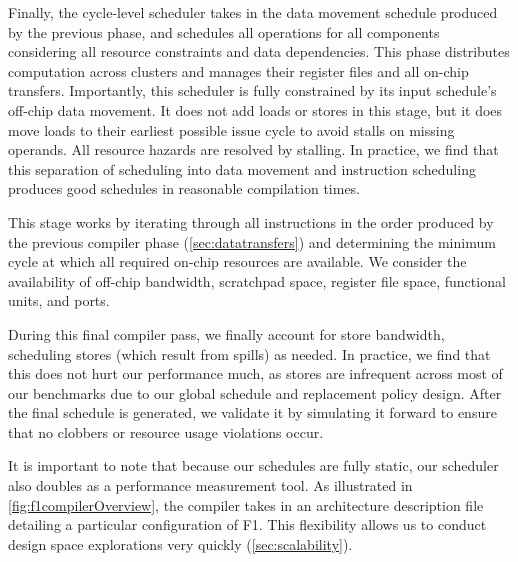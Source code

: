 Finally, the cycle-level scheduler takes in the data movement schedule produced
by the previous phase, and schedules all operations for all components
considering all resource constraints and data dependencies. This phase
distributes computation across clusters and manages their register files and
all on-chip transfers. Importantly, this scheduler is fully constrained by its
input schedule's off-chip data movement. It does not add loads or stores in
this stage, but it does move loads to their earliest possible issue cycle to
avoid stalls on missing operands. All resource hazards are resolved by
stalling. In practice, we find that this separation of scheduling into data
movement and instruction scheduling produces good schedules in reasonable
compilation times.

This stage works by iterating through all instructions in the order produced by
the previous compiler phase (\autoref{sec:datatransfers}) and determining the
minimum cycle at which all required on-chip resources are available. We
consider the availability of off-chip bandwidth, scratchpad space, register
file space, functional units, and ports.

During this final compiler pass, we finally account for store bandwidth,
scheduling stores (which result from spills) as needed. In practice, we find
that this does not hurt our performance much, as stores are infrequent across
most of our benchmarks due to our global schedule and replacement policy
design. After the final schedule is generated, we validate it by simulating it
forward to ensure that no clobbers or resource usage violations occur.

It is important to note that because our schedules are fully static, our
scheduler also doubles as a performance measurement tool. As illustrated in
\autoref{fig:f1compilerOverview}, the compiler takes in an architecture
description file detailing a particular configuration of F1. This flexibility
allows us to conduct design space explorations very quickly
(\autoref{sec:scalability}).
